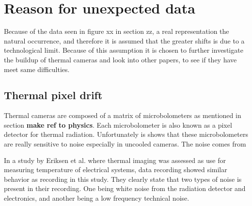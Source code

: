 \section{Reason for unexpected data}


Because of the data seen in figure xx in section zz, a real representation the natural occurrence, and therefore it is assumed that the greater shifts is due to a technological limit. Because of this assumption it is chosen to further investigate the buildup of thermal cameras and look into other papers, to see if they have meet same difficulties.

\subsection{Thermal pixel drift}

Thermal cameras are composed of a matrix of microbolometers as mentioned in section \textbf{make ref to physics}. Each microbolometer is also known as a pixel detector for thermal radiation.\cite{olbrycht2015,wolf2016} Unfortunately is shows that these microbolometers are really sensitive to noise especially in uncooled cameras. The noise comes from 



In a study by Eriksen et al. where thermal imaging was assessed as use for measuring temperature of electrical systems, data recording showed similar behavior as recording in this study. They clearly state that two types of noise is present in their recording. One being white noise from the radiation detector and electronics, and another being a low frequency technical noise. \cite{eriksen2014}